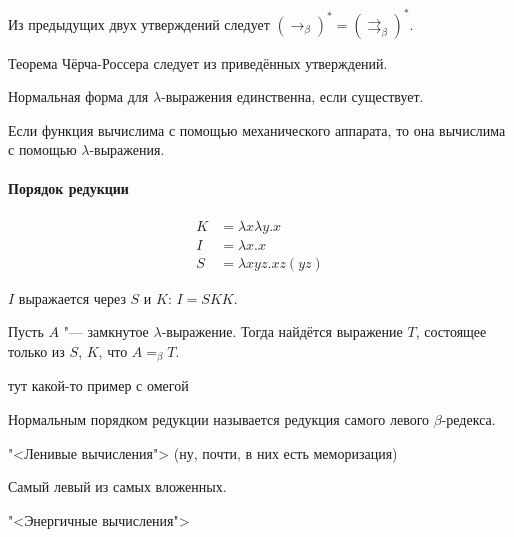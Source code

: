 \begin{statement}
    Из предыдущих двух утверждений следует $(\rightarrow_{\beta})^{*} = (\rightrightarrows_{\beta})^{*}$.
\end{statement}

Теорема Чёрча-Россера следует из приведённых утверждений.

\begin{statement}[Следствие] %
    Нормальная форма для $\lambda$-выражения единственна, если существует.
\end{statement}

\begin{theorem}
    Если функция вычислима с помощью механического аппарата, то она вычислима с помощью $\lambda$-выражения.
\end{theorem}

\paragraph{Порядок редукции}
\begin{definition}
    \begin{align*}
        K &= \lambda x \lambda y . x \\
        I &= \lambda x . x \\
        S &= \lambda x y z . x z (y z)
    \end{align*}
\end{definition}
$I$ выражается через $S$ и $K$: $I = S K K$.

\begin{statement}
    Пусть $A$ "--- замкнутое $\lambda$-выражение. Тогда найдётся выражение $T$, состоящее только из $S$, $K$, что $A =_{\beta}T$.
\end{statement}

\begin{example}
    тут какой-то пример с омегой %
\end{example}

\begin{definition}
    Нормальным порядком редукции называется редукция самого левого $\beta$-редекса.
\end{definition}
"<Ленивые вычисления"> (ну, почти, в них есть меморизация)

\begin{definition}
    Самый левый из самых вложенных.
\end{definition}
"<Энергичные вычисления">

